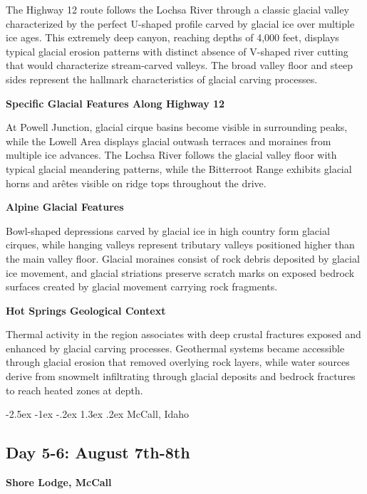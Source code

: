 \documentclass[
  11pt,
  letterpaper,
  DIV=10,
  numbers=noendperiod]{scrartcl}
\makeatletter
\renewcommand{\section}{\@startsection{section}{1}{\z@}%
  {-2.5ex \@plus -1ex \@minus -.2ex}%
  {1.3ex \@plus .2ex}%
  {\normalfont\fontsize{16}{19}\bfseries\color{twinpeaksred}}}
\makeatother
\begin{document}
The Highway 12 route follows the Lochsa River through a classic glacial
valley characterized by the perfect U-shaped profile carved by glacial
ice over multiple ice ages. This extremely deep canyon, reaching depths
of 4,000 feet, displays typical glacial erosion patterns with distinct
absence of V-shaped river cutting that would characterize stream-carved
valleys. The broad valley floor and steep sides represent the hallmark
characteristics of glacial carving processes.

\textbf{Specific Glacial Features Along Highway 12}

At Powell Junction, glacial cirque basins become visible in surrounding
peaks, while the Lowell Area displays glacial outwash terraces and
moraines from multiple ice advances. The Lochsa River follows the
glacial valley floor with typical glacial meandering patterns, while the
Bitterroot Range exhibits glacial horns and arêtes visible on ridge tops
throughout the drive.

\textbf{Alpine Glacial Features}

Bowl-shaped depressions carved by glacial ice in high country form
glacial cirques, while hanging valleys represent tributary valleys
positioned higher than the main valley floor. Glacial moraines consist
of rock debris deposited by glacial ice movement, and glacial striations
preserve scratch marks on exposed bedrock surfaces created by glacial
movement carrying rock fragments.

\textbf{Hot Springs Geological Context}

Thermal activity in the region associates with deep crustal fractures
exposed and enhanced by glacial carving processes. Geothermal systems
became accessible through glacial erosion that removed overlying rock
layers, while water sources derive from snowmelt infiltrating through
glacial deposits and bedrock fractures to reach heated zones at depth.

\newpage

\section{McCall, Idaho}\label{mccall-idaho}

\subsection{Day 5-6: August 7th-8th}\label{day-5-6-august-7th-8th}

\textbf{Shore Lodge, McCall}
\end{document}
